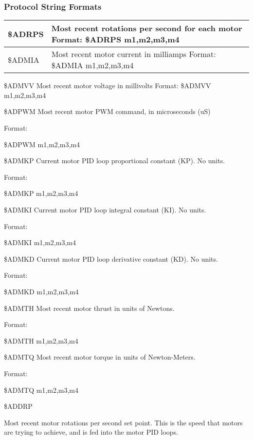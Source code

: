 \documentclass{article}
\numberwithin{equation}{section} %
\begin{document}
\subsubsection{Protocol String Formats}
\begin{tabular}{p{2cm}p{9cm}}

\hline
\$ADRPS & %
	Most recent rotations per second for each motor \newline
	Format: \newline
	\$ADRPS m1,m2,m3,m4 \\ %
\hline
\$ADMIA &
	Most recent motor current in milliamps \newline
	Format: \newline
	\$ADMIA m1,m2,m3,m4 \\
\hline
\end{tabular}

\bigskip

\$ADMVV 
Most recent motor voltage in millivolts
Format: 
\$ADMVV m1,m2,m3,m4 

\$ADPWM 
Most recent motor PWM command, in microseconds (uS) 

Format: 

\$ADPWM m1,m2,m3,m4 

\$ADMKP 
Current motor PID loop proportional constant (KP). No units. 

Format: 

\$ADMKP m1,m2,m3,m4 

\$ADMKI 
Current motor PID loop integral constant (KI). No units. 

Format: 

\$ADMKI m1,m2,m3,m4 

\$ADMKD 
Current motor PID loop derivative constant (KD). No units. 

Format: 

\$ADMKD m1,m2,m3,m4 

\$ADMTH 
Most recent motor thrust in units of Newtons. 

Format: 

\$ADMTH m1,m2,m3,m4 

\$ADMTQ 
Most recent motor torque in units of Newton-Meters. 

Format: 

\$ADMTQ m1,m2,m3,m4 

\$ADDRP 

Most recent motor rotations per second set point. This is the speed that motors are trying to achieve, and is fed into the motor PID loops. 
\end{document}
